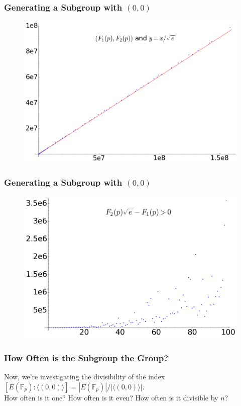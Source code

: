 \documentclass{beamer}
\newcommand{\F}{\mathbb{F}}
\begin{document}
\begin{frame}
\frametitle{Generating a Subgroup with $(0,0)$}
\begin{figure}[H]
\centering
\includegraphics[width=.8\textwidth]{f1_f2_plot_bounded_by_sqrt_e}
\end{figure}
\end{frame}

\begin{frame}
\frametitle{Generating a Subgroup with $(0,0)$}
\begin{figure}[H]
\centering
\includegraphics[width=.8\textwidth]{sqrt_e_error}
\end{figure}
\end{frame}


\begin{frame}
\frametitle{How Often is the Subgroup the Group?}
Now, we're investigating the 
divisibility of the index $[E(\F_p) : \langle (0,0) \rangle] = |E(\F_p)| / |\langle (0,0) \rangle|$. \\

How often is it one? How often is it even? How often is it divisible by $n$? 
\end{frame}
\end{document}
